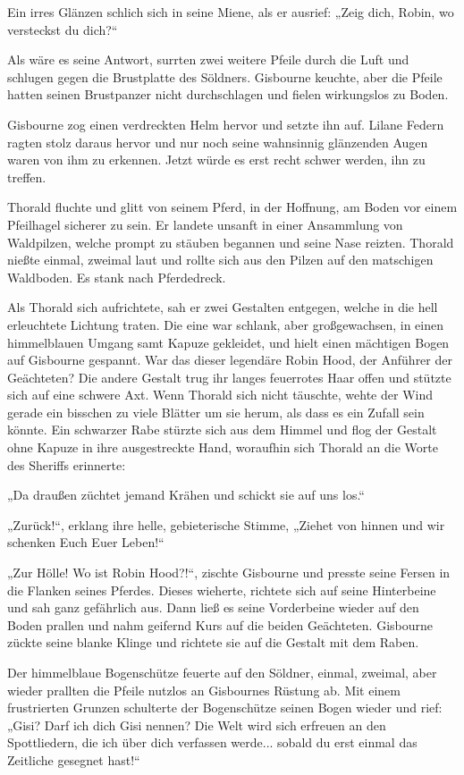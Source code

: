 Ein irres Glänzen schlich sich in seine Miene, als er ausrief: „Zeig dich, Robin, wo versteckst du dich?“

Als wäre es seine Antwort, surrten zwei weitere Pfeile durch die Luft und schlugen gegen die Brustplatte des Söldners. Gisbourne keuchte, aber die Pfeile hatten seinen Brustpanzer nicht durchschlagen und fielen wirkungslos zu Boden.

Gisbourne zog einen verdreckten Helm hervor und setzte ihn auf. Lilane Federn ragten stolz daraus hervor und nur noch seine wahnsinnig glänzenden Augen waren von ihm zu erkennen. Jetzt würde es erst recht schwer werden, ihn zu treffen.

Thorald fluchte und glitt von seinem Pferd, in der Hoffnung, am Boden vor einem Pfeilhagel sicherer zu sein. Er landete unsanft in einer Ansammlung von Waldpilzen, welche prompt zu stäuben begannen und seine Nase reizten. Thorald nießte einmal, zweimal laut und rollte sich aus den Pilzen auf den matschigen Waldboden. Es stank nach Pferdedreck.

Als Thorald sich aufrichtete, sah er zwei Gestalten entgegen, welche in die hell erleuchtete Lichtung traten. Die eine war schlank, aber großgewachsen, in einen himmelblauen Umgang samt Kapuze gekleidet, und hielt einen mächtigen Bogen auf Gisbourne gespannt. War das dieser legendäre Robin Hood, der Anführer der Geächteten? Die andere Gestalt trug ihr langes feuerrotes Haar offen und stützte sich auf eine schwere Axt. Wenn Thorald sich nicht täuschte, wehte der Wind gerade ein bisschen zu viele Blätter um sie herum, als dass es ein Zufall sein könnte. Ein schwarzer Rabe stürzte sich aus dem Himmel und flog der Gestalt ohne Kapuze in ihre ausgestreckte Hand, woraufhin sich Thorald an die Worte des Sheriffs erinnerte:

„Da draußen züchtet jemand Krähen und schickt sie auf uns los.“

„Zurück!“, erklang ihre helle, gebieterische Stimme, „Ziehet von hinnen und wir schenken Euch Euer Leben!“

„Zur Hölle! Wo ist Robin Hood?!“, zischte Gisbourne und presste seine Fersen in die Flanken seines Pferdes. Dieses wieherte, richtete sich auf seine Hinterbeine und sah ganz gefährlich aus. Dann ließ es seine Vorderbeine wieder auf den Boden prallen und nahm geifernd Kurs auf die beiden Geächteten. Gisbourne zückte seine blanke Klinge und richtete sie auf die Gestalt mit dem Raben.

Der himmelblaue Bogenschütze feuerte auf den Söldner, einmal, zweimal, aber wieder prallten die Pfeile nutzlos an Gisbournes Rüstung ab. Mit einem frustrierten Grunzen schulterte der Bogenschütze seinen Bogen wieder und rief: „Gisi? Darf ich dich Gisi nennen? Die Welt wird sich erfreuen an den Spottliedern, die ich über dich verfassen werde... sobald du erst einmal das Zeitliche gesegnet hast!“

